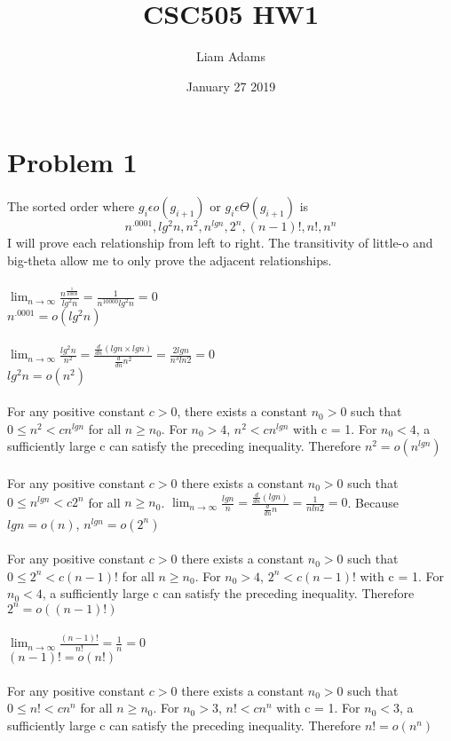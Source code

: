 \documentclass{article}
\title{CSC505 HW1}
\author{Liam Adams}
\date{January 27 2019}
\begin{document}
\maketitle

\section*{Problem 1}
The sorted order where $g_i\epsilon o(g_{i+1})$ or $g_i \epsilon\Theta(g_{i+1})$ is $$n^{.0001}, lg^2n, n^2, n^{lgn}, 2^n, (n-1)!, n!, n^n$$ I will prove each relationship from left to right. The transitivity of little-o and big-theta allow me to only prove the adjacent relationships.\\\\
$\lim_{n \to \infty}\frac{n^\frac{1}{10000}}{lg^2n} = \frac{1}{n^{10000}lg^2n} = 0$\\
$n^{.0001}=o(lg^2n)$\\\\
$\lim_{n \to \infty}\frac{lg^2n}{n^2}=\frac{\frac{d}{dn}(lgn\times lgn)}{\frac{d}{dn}n^2}=\frac{2lgn}{n^3ln2}=0$\\
$lg^2n=o(n^2)$\\\\
For any positive constant $c > 0$, there exists a constant $n_0>0$ such that $0 \leq n^2 < cn^{lgn}$ for all $n \geq n_0$. For $n_0>4$, $n^2 < cn^{lgn}$ with c = 1. For $n_0<4$, a sufficiently large c can satisfy the preceding inequality. Therefore $n^2=o(n^{lgn})$\\\\
For any positive constant $c > 0$ there exists a constant $n_0>0$ such that $0 \leq n^{lgn} < c2^n$ for all $n \geq n_0$. $\lim_{n \to \infty}\frac{lgn}{n}=\frac{\frac{d}{dn}(lgn)}{\frac{d}{dn}n}=\frac{1}{nln2}=0$. Because $lgn=o(n)$, $n^{lgn}=o(2^n)$\\\\
For any positive constant $c > 0$ there exists a constant $n_0>0$ such that $0 \leq 2^{n} < c(n-1)!$ for all $n \geq n_0$. For $n_0>4$, $2^n < c(n-1)!$ with c = 1. For $n_0<4$, a sufficiently large c can satisfy the preceding inequality. Therefore $2^{n}=o((n-1)!)$\\\\
$\lim_{n \to \infty}\frac{(n-1)!}{n!}=\frac{1}{n}=0$\\
$(n-1)!=o(n!)$\\\\
For any positive constant $c > 0$ there exists a constant $n_0>0$ such that $0 \leq n! < cn^n$ for all $n \geq n_0$. For $n_0>3$, $n! < cn^n$ with c = 1. For $n_0<3$, a sufficiently large c can satisfy the preceding inequality. Therefore $n!=o(n^n)$\\\\
\end{document}
